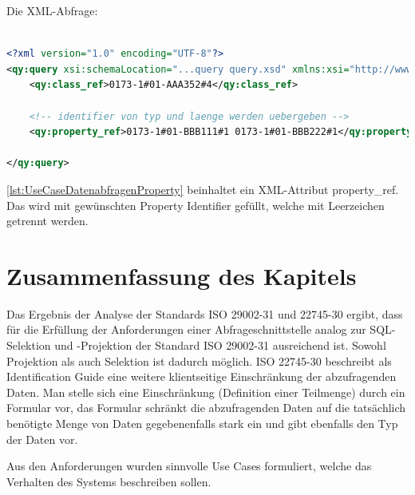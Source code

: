 Die XML-Abfrage:
\begin{lstlisting}[caption=Query Beispiel - Daten abfragen mit Propertyeinschränkung, language=XML, label=lst:UseCaseDatenabfragenProperty]

<?xml version="1.0" encoding="UTF-8"?>
<qy:query xsi:schemaLocation="...query query.xsd" xmlns:xsi="http://www.w3.org/2001/XMLSchema-instance" xmlns:cat="...catalogue" xmlns:val="...value" xmlns:qy="...query" xmlns:bas="...basic">
	<qy:class_ref>0173-1#01-AAA352#4</qy:class_ref>
	
	<!-- identifier von typ und laenge werden uebergeben -->
	<qy:property_ref>0173-1#01-BBB111#1 0173-1#01-BBB222#1</qy:property_ref> 
	
</qy:query>
\end{lstlisting}

\autoref{lst:UseCaseDatenabfragenProperty} beinhaltet ein XML-Attribut property\_ref. Das wird mit gewünschten Property Identifier gefüllt, welche mit Leerzeichen getrennt werden. 


\section{Zusammenfassung des Kapitels}

Das Ergebnis der Analyse der Standards ISO 29002-31 und 22745-30 ergibt, dass für die Erfüllung der Anforderungen einer Abfrageschnittstelle analog zur SQL-Selektion und -Projektion der Standard ISO 29002-31 ausreichend ist. Sowohl Projektion als auch Selektion ist dadurch möglich. ISO 22745-30 beschreibt als Identification Guide eine weitere klientseitige Einschränkung der abzufragenden Daten. Man stelle sich eine Einschränkung (Definition einer Teilmenge) durch ein Formular vor, das Formular schränkt die abzufragenden Daten auf die tatsächlich benötigte Menge von Daten gegebenenfalls stark ein und gibt ebenfalls den Typ der Daten vor.

Aus den Anforderungen wurden sinnvolle \glspl{Use Case} formuliert, welche das Verhalten des Systems beschreiben sollen.  
